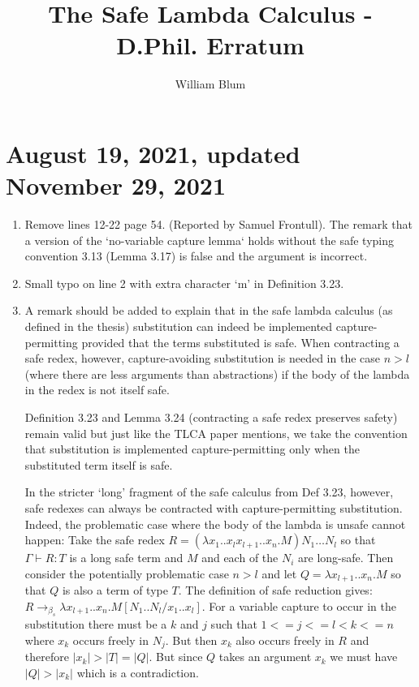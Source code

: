 \documentclass[12pt]{article}
\begin{document}
\title{The Safe Lambda Calculus - D.Phil. Erratum}
\author{William Blum}

\maketitle

\section {August 19, 2021, updated November 29, 2021}

\begin{enumerate}
\item Remove lines 12-22 page 54. (Reported by Samuel Frontull).
The remark that a version of the `no-variable capture lemma` holds without the safe typing convention 3.13
 (Lemma 3.17) is false and the argument is incorrect.

\item Small typo on line 2 with extra character `m' in Definition 3.23.

\item A remark should be added to explain that in the safe lambda calculus (as defined in the thesis) substitution can indeed
be implemented capture-permitting provided that the terms substituted is safe. When contracting a safe redex, however,
capture-avoiding substitution is needed in the case $n>l$ (where there are less arguments than abstractions) if the body of the lambda in the redex is not itself safe.

Definition 3.23 and Lemma 3.24 (contracting a safe redex preserves safety) remain valid but just like the TLCA paper mentions, we take the convention that substitution is implemented capture-permitting only when the substituted term itself is safe.

In the stricter `long' fragment of the safe calculus from Def 3.23, however, safe redexes can always be contracted with capture-permitting substitution. Indeed, the problematic case where the body of the lambda is unsafe cannot happen:
Take the safe redex $R = (\lambda x_1 .. x_l x_{l+1} .. x_n.  M) N_1 … N_l$ so that
$ \Gamma \vdash R : T$ is a long safe term and $M$ and each of the $N_i$ are long-safe.
Then consider the potentially problematic case $n > l$ and let $Q = \lambda x_{l+1} .. x_n.  M$ so that $Q$ is also a term of type $T$. The definition of safe reduction gives:
 $ R \rightarrow_{\beta_s} \lambda x_{l+1} .. x_n . M[N_1..N_l/x_1..x_l]$.
For a variable capture to occur in the substitution there must be a $k$ and $j$ such that $1<=j<= l < k <= n$  where $x_k$ occurs freely in $N_j$. But then $x_k$ also occurs freely in $R$ and therefore $|x_k|> | T| = |Q|$. But since $Q$ takes an argument $x_k$ we must have $|Q| > |x_k|$ which is a contradiction.



\end{enumerate}
\end{document}
